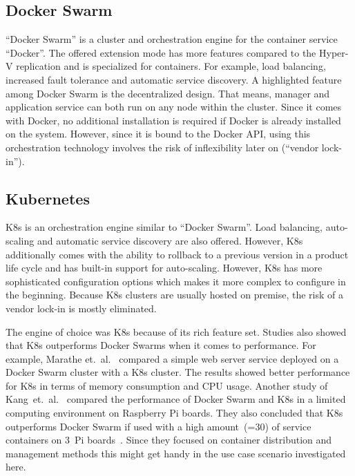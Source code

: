 \subsection{Docker Swarm} \enquote{Docker Swarm} is a cluster and orchestration engine for the container service \enquote{Docker}. The offered extension mode has more features compared to the Hyper-V replication and is specialized for containers. For example, load balancing, increased fault tolerance and automatic service discovery.
A highlighted feature among Docker Swarm is the decentralized design. That means, manager and application service can both run on any node within the cluster. Since it comes with Docker, no additional installation is required if Docker is already installed on the system.
However, since it is bound to the Docker \ac{API}, using this orchestration technology involves the risk of inflexibility later on (\enquote{vendor lock-in}).

 
\subsection{Kubernetes}
\acf{K8s} is an orchestration engine similar to \enquote{Docker Swarm}. Load balancing, auto-scaling and automatic service discovery are also offered. However, \ac{K8s} additionally comes with the ability to rollback to a previous version in a product life cycle and has built-in support for auto-scaling.
However, \ac{K8s} has more sophisticated configuration options which makes it more complex to configure in the beginning.
Because \ac{K8s} clusters are usually hosted on premise, the risk of a vendor lock-in is mostly eliminated.

The engine of choice was \ac{K8s} because of its rich feature set.
Studies also showed that \ac{K8s} outperforms Docker Swarms when it comes to performance. For example, Marathe et.~al.~\cite{Marathe.2019} compared a simple web server service deployed on a Docker Swarm cluster with a \ac{K8s} cluster. The results showed better performance for \ac{K8s} in terms of memory consumption and CPU usage. Another study of Kang~et.~al.~\cite{Kang.2021} compared the performance of Docker Swarm and \ac{K8s} in a limited computing environment on Raspberry Pi boards. They also concluded that \ac{K8s} outperforms Docker Swarm if used with a high amount~(=30) of service containers on 3~Pi boards~\cite{Kang.2021}. Since they focused on container distribution and management methods this might get handy in the use case scenario investigated here.


